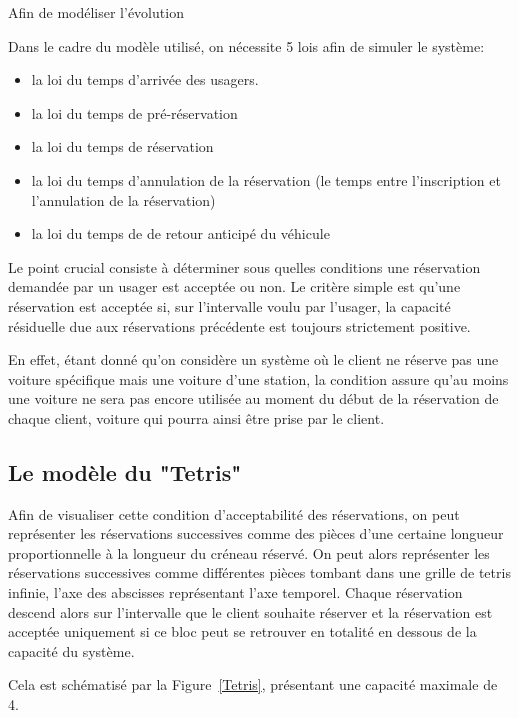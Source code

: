\documentclass[12pt,a4paper]{article}
\newcommand{\1}[1]{\mathbbm{1}_{\{#1\}} }
\theoremstyle{definition}
\begin{document}
{Afin de modéliser l'évolution 


Dans le cadre du modèle utilisé, on nécessite 5 lois afin de simuler le système:
\begin{itemize}
\item la loi du temps d'arrivée des usagers.
\item la loi du temps de pré-réservation
\item la loi du temps de réservation
\item la loi du temps d'annulation de la réservation (le temps entre l'inscription et l'annulation de la réservation)
\item la loi du temps de de retour anticipé du véhicule
\end{itemize}

Le point crucial consiste à déterminer sous quelles conditions une réservation demandée par un usager est acceptée ou non.  Le critère simple est qu'une réservation est acceptée si, sur l'intervalle voulu par l'usager, la capacité résiduelle due aux réservations précédente est toujours strictement positive.

En effet, étant donné qu'on considère un système où le client ne réserve pas une voiture spécifique mais une voiture d'une station, la condition assure qu'au moins une voiture ne sera pas encore utilisée au moment du début de la réservation de chaque client, voiture qui pourra ainsi être prise par le client.


\subsection{Le modèle du "Tetris"}

Afin de visualiser cette condition d'acceptabilité des réservations, on peut représenter les réservations successives comme des pièces d'une certaine longueur proportionnelle à la longueur du créneau réservé. On peut alors représenter les réservations successives comme différentes pièces tombant dans une grille de tetris infinie, l'axe des abscisses représentant l'axe temporel.
Chaque réservation descend alors sur l'intervalle que  le client souhaite réserver et la réservation est acceptée uniquement si ce bloc peut se retrouver en totalité en dessous de la capacité du système.

Cela est schématisé par la Figure~\ref{Tetris}, présentant une capacité maximale de 4.  


\begin{figure}[h]
\centering
\begin{tikzpicture}


\end{tikzpicture}
\end{figure}}
\end{document}
